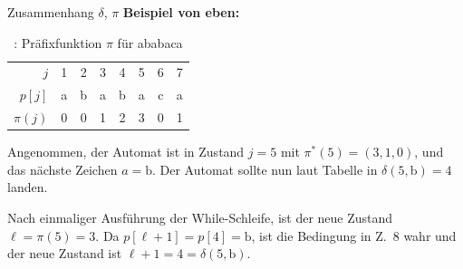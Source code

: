 \documentclass[xcolor=dvipsnames, aspectratio=169]{beamer}
\begin{document}
\begin{frame}{Zusammenhang $\delta$, $\pi$}
\textbf{Beispiel von eben:}\vspace*{-2em}
\begin{table}\setlength\extrarowheight{.3em}
\begin{tabular}{r@{\hskip 2em}ccccccc}
\toprule
$j$ & 1 & 2 & 3 & 4 & 5 & 6 & 7 \\ 
$p[j]$ & a & b & a & b & a & c & a \\ 
$\pi(j)$ & 0 & 0 & 1 & 2 & 3 & 0 & 1 \\ 
\bottomrule
\end{tabular}
\caption{\cite{cormenalgorithms2009}: Präfixfunktion $\pi$ für ababaca}
\end{table}
\vspace*{-.5em}
Angenommen, der Automat ist in Zustand $j=5$ mit $\pi^*(5)=(3,1,0)$, und das nächste Zeichen $a=\mathrm{b}$. Der Automat sollte nun laut Tabelle in $\delta(5,\mathrm{b})=4$ landen.\pause\medskip

Nach einmaliger Ausführung der While-Schleife, ist der neue Zustand $\ell=\pi(5)=3$. Da $p[\ell+1]=p[4]=\mathrm{b}$, ist die Bedingung in Z.\ 8 wahr und der neue Zustand ist $\ell+1=4=\delta(5,\mathrm{b})$.
\end{frame}
\end{document}
